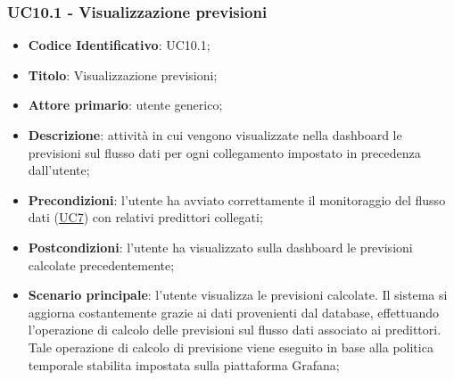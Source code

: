 		\label{par:UC10.1}
	\subsubsection{UC10.1 - Visualizzazione previsioni}
		\begin{itemize}
			\item\textbf{Codice Identificativo}: UC10.1;
			\item\textbf{Titolo}: Visualizzazione previsioni;
			\item\textbf{Attore primario}: utente generico;
			\item\textbf{Descrizione}: attività in cui vengono visualizzate nella dashboard le previsioni sul flusso dati per ogni collegamento impostato in precedenza dall'utente;
			\item\textbf{Precondizioni}: l'utente ha avviato correttamente il monitoraggio del flusso dati (\hyperref[par:UC7]{UC7}) con relativi predittori collegati;
			\item\textbf{Postcondizioni}: l'utente ha visualizzato sulla dashboard le previsioni calcolate precedentemente;
			\item\textbf{Scenario principale}: l'utente visualizza le previsioni calcolate. Il sistema si aggiorna costantemente grazie ai dati provenienti dal database, effettuando l'operazione di calcolo delle previsioni sul flusso dati associato ai predittori. Tale operazione di calcolo di previsione viene eseguito in base alla politica temporale stabilita impostata sulla piattaforma Grafana;
		\end{itemize}
			
		
		\label{par:UC10.2}
